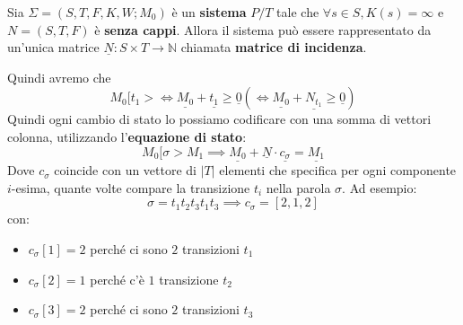 \begin{definizione}
    Sia $\Sigma = (S,T,F,K,W;M_0)$ è un \textbf{sistema} $P/T$ tale che
    $\forall s\in S,K(s)=\infty$ e $N=(S,T,F)$ è \textbf{senza cappi}. Allora il
    sistema può essere rappresentato da un'unica matrice $\underline{N}:S\times
        T\rightarrow\mathbb{N}$
    chiamata \textbf{matrice di incidenza}.
\end{definizione}
Quindi avremo che
\begin{equation}
    M_0[t_1>\iff \underline{M_0}+\underline{t_1}\ge \underline{0} (\iff
    \underline{M_0}+\underline{N_{t_1}}\ge \underline{0})
\end{equation}
Quindi ogni cambio di stato lo possiamo codificare con una somma di vettori colonna,
utilizzando l'\textbf{equazione di stato}:
\begin{equation}
    M_0[\sigma>M_1\implies \underline{M_0}+\underline{N}\cdot \underline{c_\sigma}
    =\underline{M_1}
\end{equation}
Dove $c_\sigma$ coincide con un vettore di $|T|$ elementi che specifica per ogni 
componente $i$-esima, quante volte compare la transizione $t_i$ nella parola $\sigma$.
Ad esempio:
$$\sigma = t_1t_2t_3t_1t_3 \implies c_\sigma = \left[2, 1, 2\right]$$
con:
\begin{itemize}
    \item $c_\sigma [1]= 2$ perché ci sono $2$ transizioni $t_1$
    \item $c_\sigma [2]= 1$ perché c'è $1$ transizione $t_2$
    \item $c_\sigma [3]= 2$ perché ci sono $2$ transizioni $t_3$
\end{itemize}

